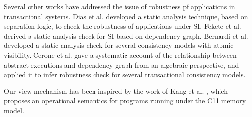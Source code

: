Several other works have addressed the issue of robustness pf applications in transactional systems. 
Dias et al. \cite{dias-tm} developed a static analysis technique, based on separation logic, 
to check the robustness of applications under SI. Fekete et al. \cite{fekete-tods} derived 
a static analysis check for SI based on dependency graph. Bernardi et al. \cite{giovanni-concur16} 
developed a static analysis check for several consistency models with atomic visibility. 
Cerone et al. \cite{laws} gave a systematic account of the relationship between abstract 
executions and dependency graph from an algebraic perspective, and applied it to infer 
robustness check for several transactional consistency models.

Our view mechanism has been inspired by the work of Kang et al. \cite{promises}, 
which proposes an operational semantics for programs running under the C11 memory model.